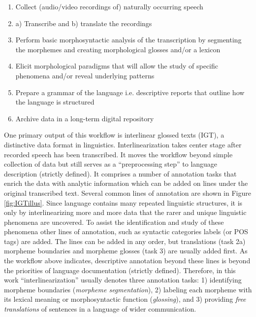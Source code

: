 \begin{enumerate}
    \item Collect (audio/video recordings of) naturally occurring speech
    \item a) Transcribe and b) translate the recordings
    \item Perform basic morphosyntactic analysis of the transcription by segmenting the morphemes and creating morphological glosses and/or a lexicon
    \item Elicit morphological paradigms that will allow the study of specific phenomena and/or reveal underlying patterns
    \item Prepare a grammar of the language i.e. descriptive reports that outline how the language is structured
    \item Archive data in a long-term digital repository
\end{enumerate}

One primary output of this workflow is interlinear glossed texts (IGT), a distinctive data format in linguistics. 
Interlinearization takes center stage after recorded speech has been transcribed. It moves the workflow beyond simple collection of data but still serves as a ``preprocessing step'' to \citep{moon_unsupervised_2009} language description (strictly defined). It comprises a number of annotation tasks that enrich the data with analytic information which can be added on lines under the original transcribed text. Several common lines of annotation are shown in Figure \ref{fig:IGTillus}. Since language contains many repeated linguistic structures, it is only by interlinearizing more and more data that the rarer and unique linguistic phenomena are uncovered. To assist the identification and study of these phenomena other lines of annotation, such as syntactic categories labels (or POS tags) are added. The lines can be added in any order, but translations (task 2a) morpheme boundaries and morpheme glosses (task 3) are usually added first. As the workflow above indicates, descriptive annotation beyond these lines is beyond the priorities of language documentation (strictly defined). Therefore, in this work ``interlinearization'' usually denotes three annotation tasks: 1) identifying morpheme boundaries (\emph{morpheme segmentation}), 2) labeling each morpheme with its lexical meaning or morphosyntactic function (\emph{glossing}), and 3) providing \emph{free translations} of sentences in a language of wider communication.  

